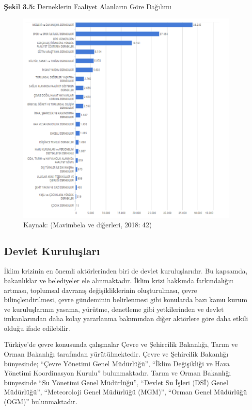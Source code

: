 \documentclass[
]{book}
\begin{document}
\textbf{Şekil 3.5:} Derneklerin Faaliyet Alanların Göre Dağılımı

\begin{figure}
\includegraphics[width=0.95\linewidth,height=0.95\textheight]{tablolar-sekiller/sekil-3-5} \caption{Kaynak: (Mavimbela ve diğerleri, 2018: 42)}\label{fig:unnamed-chunk-9}
\end{figure}

\hypertarget{devlet-kuruluux15flarux131}{%
\subsection{Devlet Kuruluşları}\label{devlet-kuruluux15flarux131}}

İklim krizinin en önemli aktörlerinden biri de devlet kuruluşlarıdır. Bu kapsamda, bakanlıklar ve belediyeler ele alınmaktadır. İklim krizi hakkında farkındalığın artması, toplumsal davranış değişikliklerinin oluşturulması, çevre bilinçlendirilmesi, çevre gündeminin belirlenmesi gibi konularda bazı kamu kurum ve kuruluşlarının yasama, yürütme, denetleme gibi yetkilerinden ve devlet imkanlarından daha kolay yararlanma bakımından diğer aktörlere göre daha etkili olduğu ifade edilebilir.

Türkiye'de çevre konusunda çalışmalar Çevre ve Şehircilik Bakanlığı, Tarım ve Orman Bakanlığı tarafından yürütülmektedir. Çevre ve Şehircilik Bakanlığı bünyesinde; ``Çevre Yönetimi Genel Müdürlüğü'', ``İklim Değişikliği ve Hava Yönetimi Koordinasyon Kurulu'' bulunmaktadır. Tarım ve Orman Bakanlığı bünyesinde ``Su Yönetimi Genel Müdürlüğü'', ``Devlet Su İşleri (DSİ) Genel Müdürlüğü'', ``Meteoroloji Genel Müdürlüğü (MGM)'', ``Orman Genel Müdürlüğü (OGM)'' bulunmaktadır.
\end{document}
